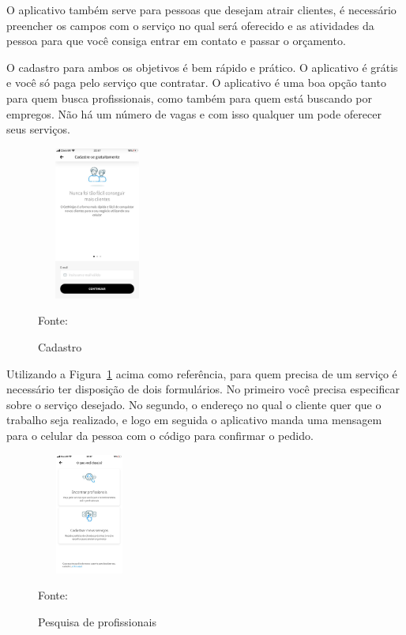 O aplicativo também serve para pessoas que desejam atrair clientes, é necessário preencher os campos com o serviço no qual será oferecido e as atividades da pessoa para que você consiga entrar em contato e passar o orçamento.

O cadastro para ambos os objetivos é bem rápido e prático. O aplicativo é grátis e você só paga pelo serviço que contratar. O aplicativo é uma boa opção tanto para quem busca profissionais, como também para quem está buscando por empregos. Não há um número de vagas e com isso qualquer um pode oferecer seus serviços.


\begin{figure}[!h]
	\centering
		
	\caption{Cadastro }
	\includegraphics[width=150px, height=190px]{./images/getNinjasMobile.jpeg}
	\label{fig:get1}
	\par {Fonte: \cite{get-ninjasMobilea}}
\end{figure}

Utilizando a Figura~\hypersetup{linkcolor=black}\ref{fig:get1} acima como referência, para quem precisa de um serviço é necessário ter disposição de dois formulários. No primeiro você precisa especificar sobre o serviço desejado. No segundo, o endereço no qual o cliente quer que o trabalho seja realizado, e logo em seguida o aplicativo manda uma mensagem para o celular da pessoa com o código para confirmar o pedido.

\begin{figure}[!h]
	\centering
		
	\caption{Pesquisa de profissionais}
	\includegraphics[width=130px, height=150px]{./images/getNinjasMobile3.jpeg}
		\label{fig:get2}
	\par {Fonte: \cite{get-ninjasMobilea}}
\end{figure}
\newpage

